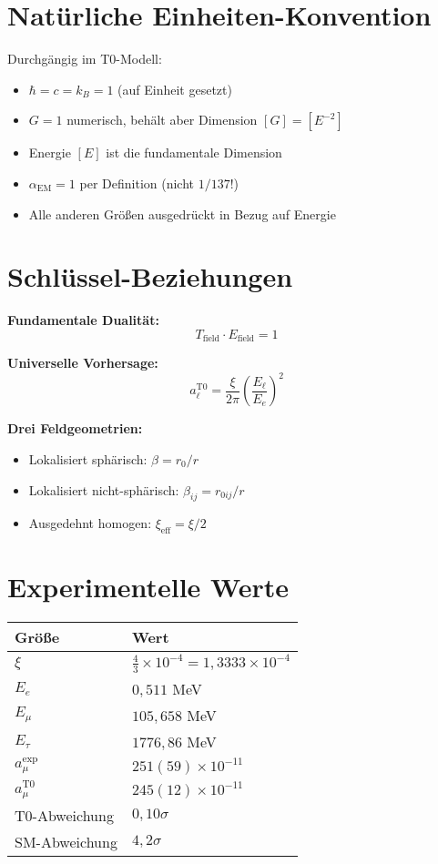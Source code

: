 \documentclass[12pt,a4paper]{report}
\newcommand{\rzero}{r_0}                  %
\begin{document}
	\section{Natürliche Einheiten-Konvention}
	\label{sec:natural_units_convention}
	
	Durchgängig im T0-Modell:
	\begin{itemize}
		\item $\hbar = c = k_B = 1$ (auf Einheit gesetzt)
		\item $G = 1$ numerisch, behält aber Dimension $[G] = [E^{-2}]$
		\item Energie $[E]$ ist die fundamentale Dimension
		\item $\alpha_{\text{EM}} = 1$ per Definition (nicht $1/137$!)
		\item Alle anderen Größen ausgedrückt in Bezug auf Energie
	\end{itemize}
	
	\section{Schlüssel-Beziehungen}
	\label{sec:key_relationships}
	
	\textbf{Fundamentale Dualität:}
	\begin{equation}
		T_{\text{field}} \cdot E_{\text{field}} = 1
	\end{equation}
	
	\textbf{Universelle Vorhersage:}
	\begin{equation}
		a_\ell^{\text{T0}} = \frac{\xi}{2\pi} \left(\frac{E_\ell}{E_e}\right)^2
	\end{equation}
	
	\textbf{Drei Feldgeometrien:}
	\begin{itemize}
		\item Lokalisiert sphärisch: $\beta = \rzero/r$
		\item Lokalisiert nicht-sphärisch: $\beta_{ij} = r_{0ij}/r$
		\item Ausgedehnt homogen: $\xi_{\text{eff}} = \xi/2$
	\end{itemize}
	
	\section{Experimentelle Werte}
	\label{sec:experimental_values}
	
	\begin{longtable}{|l|l|}
		\hline
		\textbf{Größe} & \textbf{Wert} \\
		\hline
		$\xi$ & $\frac{4}{3} \times 10^{-4} = 1,3333 \times 10^{-4}$ \\
		$E_e$ & $0,511$ MeV \\
		$E_\mu$ & $105,658$ MeV \\
		$E_\tau$ & $1776,86$ MeV \\
		$a_\mu^{\text{exp}}$ & $251(59) \times 10^{-11}$ \\
		$a_\mu^{\text{T0}}$ & $245(12) \times 10^{-11}$ \\
		T0-Abweichung & $0,10\sigma$ \\
		SM-Abweichung & $4,2\sigma$ \\
		\hline
	\end{longtable}
	
\end{document}
